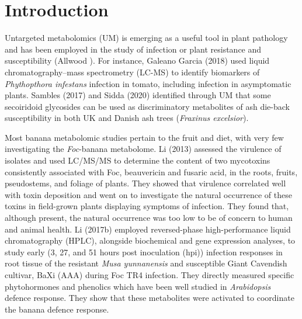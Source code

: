 \section{Introduction}

Untargeted metabolomics (UM) is emerging as a useful tool in plant pathology and has been employed in the study of infection or plant resistance and susceptibility (Allwood ). For instance, Galeano Garcia \et (2018) used liquid chromatography–mass spectrometry (LC-MS) to identify biomarkers of \textit{Phythopthora infestans} infection in tomato, including infection in asymptomatic plants. Sambles \et  (2017) and Sidda \et (2020) identified through UM that some secoiridoid glycosides can be used as discriminatory metabolites of ash die-back susceptibility in both UK and Danish ash trees (\textit{Fraxinus excelsior}). 

Most banana metabolomic studies pertain to the fruit and diet, with very few investigating the \textit{Foc}-banana metabolome. Li \et (2013) assessed the virulence of \Foc isolates and used LC/MS/MS to determine the content of two mycotoxins consistently associated with Foc, beauvericin and fusaric acid, in the roots, fruits, pseudostems, and foliage of plants. They showed that virulence correlated well with toxin deposition and went on to investigate the natural occurrence of these toxins in field-grown plants displaying symptoms of \Foc infection. They found that, although present, the natural occurrence was too low to be of concern to human and animal health. 
Li \et (2017b) employed reversed-phase high-performance liquid chromatography (HPLC), alongside biochemical and gene expression analyses, to study early (3, 27, and 51 hours post inoculation (hpi)) infection responses in root tissue of the resistant \textit{Musa yunnanensis} and susceptible Giant Cavendish cultivar, BaXi (\Musa AAA) during Foc TR4 infection. They directly measured specific phytohormones and phenolics which have been well studied in \textit{Arabidopsis} defence response. They show that these metabolites were activated to coordinate the banana defence response.
